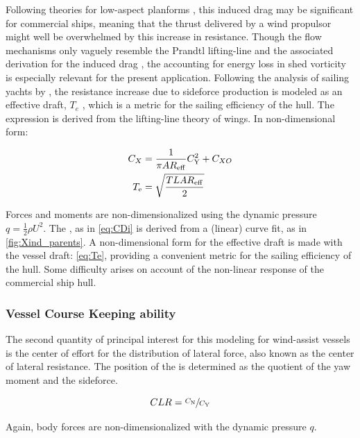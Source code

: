 \documentclass[twoside,twocolumn]{article}
\begin{document}
Following theories for low-aspect planforms \cite{Hoerner1985,Jones1946}, this induced drag may be significant for commercial ships, meaning that the thrust delivered by a wind propulsor might well be overwhelmed by this increase in resistance. Though the flow mechanisms only vaguely resemble the Prandtl lifting-line and the associated derivation for the induced drag \cite{Prandtl1918}, the accounting for energy loss in shed vorticity is especially relevant for the present application. Following the analysis of sailing yachts by \citet{Gerritsma1992}, the resistance increase due to sideforce production is modeled as an effective draft, $T_{e}$ \cite{Gerritsma1993}, which is a metric for the sailing efficiency of the hull. The expression is derived from the lifting-line theory of wings. In non-dimensional form:

\begin{subequations}
	\begin{align}
	C_{X}&=\frac{1}{\pi AR_\mathrm{eff}}C_\mathrm{Y}^2+C_{XO} 
	\label{eq:CDi}\\
	T_\mathrm{e}&=\sqrt{\dfrac{TLAR_\mathrm{eff}}{2}} 
	\label{eq:Te}
	\end{align}
\end{subequations}

\noindent
Forces and moments are non-dimensionalized using the dynamic pressure $q=\frac{1}{2}\rho U^2$. The \ARe, as in \cref{eq:CDi} is derived from a (linear) curve fit, as in \cref{fig:Xind_parents}. A non-dimensional form for the effective draft \Te is made with the vessel draft: \TeT \cref{eq:Te}, providing a convenient metric for the sailing efficiency of the hull. Some difficulty arises on account of the non-linear response of the commercial ship hull.

\subsubsection{Vessel Course Keeping ability}
The second quantity of principal interest for this modeling for wind-assist vessels is the center of effort for the distribution of lateral force, also known as the center of lateral resistance. The position of the \CLR is determined as the quotient of the yaw moment and the sideforce.

\begin{equation}
CLR=\sfrac{C_\mathrm{N}}{C_\mathrm{Y}}
\end{equation}

\noindent
Again, body forces are non-dimensionalized with the dynamic pressure $q$.
\end{document}
